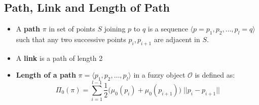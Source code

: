 \subsection*{Path, Link and Length of Path}

\begin{itemize}
  \item A \textbf{path} $\pi$ in set of points $S$ joining $p$ to $q$
    is a sequence $\langle p = p_1, p_2, \ldots, p_l = q \rangle$
    such that any two successive points $p_i, p_{i+1}$ are adjacent in $S$.
  \item A \textbf{link} is a path of length 2
  \item \textbf{Length of a path} $\pi = \langle p_1, p_2, \ldots,
    p_l \rangle$ in a fuzzy object $\mathcal{O}$ is defined as:
    \begin{equation*}
      \Pi_0(\pi) = \sum_{i=1}^{l-1} \frac{1}{2} \Big(\mu_0(p_i) +
      \mu_0(p_{i+1})\Big) \; || p_i - p_{i+1} ||
    \end{equation*}
\end{itemize}
